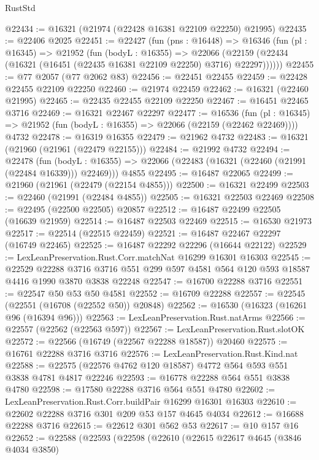 \begin{lexlean}{RustStd}
\begin{coremodule}
@22434 := @16321 (@21974 (@22428 @16381 @22109 @22250) @21995)
@22435 := @22406 @2025
@22451 := @22427
    (fun (pns : @16448) =>
    @16346
      (fun (pl : @16345) =>
      @21952
        (fun (bodyL : @16355) =>
        @22066 (@22159 (@22434 (@16321 (@16451 (@22435 @16381 @22109 @22250) @3716) @22297))))))
@22455 := @77 @2057 (@77 @2062 @83)
@22456 := @22451 @22455
@22459 := @22428 @22455 @22109 @22250
@22460 := @21974 @22459
@22462 := @16321 (@22460 @21995)
@22465 := @22435 @22455 @22109 @22250
@22467 := @16451 @22465 @3716
@22469 := @16321 @22467 @22297
@22477 := @16536
    (fun (pl : @16345) => @21952 (fun (bodyL : @16355) => @22066 (@22159 (@22462 @22469))))
    @4732
@22478 := @16319 @16355
@22479 := @21962 @4732
@22483 := @16321 (@21960 (@21961 (@22479 @22155)))
@22484 := @21992 @4732
@22494 := @22478
    (fun (bodyL : @16355) => @22066 (@22483 (@16321 (@22460 (@21991 (@22484 @16339))) @22469)))
    @4855
@22495 := @16487 @22065
@22499 := @21960 (@21961 (@22479 (@22154 @4855)))
@22500 := @16321 @22499
@22503 := @22460 (@21991 (@22484 @4855))
@22505 := @16321 @22503 @22469
@22508 := @22495 (@22500 @22505) @20857
@22512 := @16487 @22499 @22505 (@16639 @21959)
@22514 := @16487 @22503 @22469
@22515 := @16530 @21973
@22517 := @22514 (@22515 @22459)
@22521 := @16487 @22467 @22297 (@16749 @22465)
@22525 := @16487 @22292 @22296 (@16644 @22122)
@22529 := LexLeanPreservation.Rust.Corr.matchNat @16299 @16301 @16303
@22545 := @22529
    @22288
    @3716
    @3716
    @551
    @299
    @597
    @4581
    @564
    @120
    @593
    @18587
    @4416
    @1990
    @3870
    @3838
    @22248
@22547 := @16700 @22288 @3716
@22551 := @22547 @50 @53 @50 @4581
@22552 := @16709 @22288
@22557 := @22545 (@22551 (@16708 (@22552 @50)) @20848)
@22562 := @16530 (@16323 (@16261 @96 (@16394 @96)))
@22563 := LexLeanPreservation.Rust.natArms
@22566 := @22557 (@22562 (@22563 @597))
@22567 := LexLeanPreservation.Rust.slotOK
@22572 := @22566 (@16749 (@22567 @22288 @18587)) @20460
@22575 := @16761 @22288 @3716 @3716
@22576 := LexLeanPreservation.Rust.Kind.nat
@22588 := @22575 (@22576 @4762 @120 @18587) @4772 @564 @593 @551 @3838 @4781 @4817 @22246
@22593 := @16778 @22288 @564 @551 @3838 @4780
@22598 := @17580 @22288 @3716 @564 @551 @4780
@22602 := LexLeanPreservation.Rust.Corr.buildPair @16299 @16301 @16303
@22610 := @22602 @22288 @3716 @301 @209 @53 @157 @4645 @4034
@22612 := @16688 @22288 @3716
@22615 := @22612 @301 @562 @53
@22617 := @10 @157 @16
@22652 := @22588
    (@22593
      (@22598
        (@22610
          (@22615
            @22617
            @4645
            (@3846 @4034 @3850)

\end{coremodule}
\end{lexlean}
